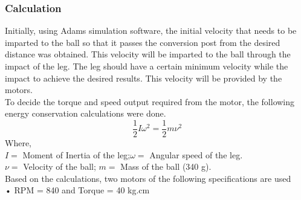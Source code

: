         \subsubsection{Calculation}
            Initially, using Adams simulation software, the initial velocity that needs to be imparted to the ball so that it passes the
            conversion post from the desired distance was obtained. This velocity will be imparted to the ball through the impact of
            the leg. The leg should have a certain minimum velocity while the impact to achieve the desired results. This velocity
            will be provided by the motors.                                                                                                         \\
            To decide the torque and speed output required from the motor, the following energy conservation calculations were
            done.                                                                                                                                   \\   
            $$\frac{1}{2} I {\omega}^2  =  \frac{1}{2} m {\nu}^2$$     
            Where,                                                                                                                                  \\
            $I =$ Moment of Inertia of the leg;\tab $\omega =$ Angular speed of the leg.                                                            \\
            $\nu =$ Velocity of the ball;      \tab $m =$ Mass of the ball (340 g).                                                                 \\
            Based on the calculations, two motors of the following specifications are used                                                          \\
            •  RPM = 840 and Torque = 40 kg.cm                                                                                                      \\


